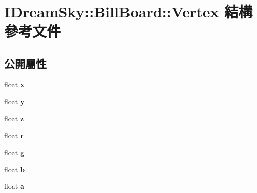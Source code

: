 \hypertarget{struct_i_dream_sky_1_1_bill_board_1_1_vertex}{}\section{I\+Dream\+Sky\+:\+:Bill\+Board\+:\+:Vertex 結構 參考文件}
\label{struct_i_dream_sky_1_1_bill_board_1_1_vertex}
\subsection*{公開屬性}
\begin{DoxyCompactItemize}
\item 
float {\bfseries x}\hypertarget{struct_i_dream_sky_1_1_bill_board_1_1_vertex_a42cf3e2e803a0408517d64661e968404}{}\label{struct_i_dream_sky_1_1_bill_board_1_1_vertex_a42cf3e2e803a0408517d64661e968404}

\item 
float {\bfseries y}\hypertarget{struct_i_dream_sky_1_1_bill_board_1_1_vertex_a92d36b2c938e440eac75be796e89fcd2}{}\label{struct_i_dream_sky_1_1_bill_board_1_1_vertex_a92d36b2c938e440eac75be796e89fcd2}

\item 
float {\bfseries z}\hypertarget{struct_i_dream_sky_1_1_bill_board_1_1_vertex_a68b1b049cd38650c8b683f0033e2f2ca}{}\label{struct_i_dream_sky_1_1_bill_board_1_1_vertex_a68b1b049cd38650c8b683f0033e2f2ca}

\item 
float {\bfseries r}\hypertarget{struct_i_dream_sky_1_1_bill_board_1_1_vertex_aa5c46eedc0b29b1b47008cb9a01fd82e}{}\label{struct_i_dream_sky_1_1_bill_board_1_1_vertex_aa5c46eedc0b29b1b47008cb9a01fd82e}

\item 
float {\bfseries g}\hypertarget{struct_i_dream_sky_1_1_bill_board_1_1_vertex_a176c5ce86e83466b7810f9028d91fa15}{}\label{struct_i_dream_sky_1_1_bill_board_1_1_vertex_a176c5ce86e83466b7810f9028d91fa15}

\item 
float {\bfseries b}\hypertarget{struct_i_dream_sky_1_1_bill_board_1_1_vertex_a7deaddfe40aec739197917be4a105963}{}\label{struct_i_dream_sky_1_1_bill_board_1_1_vertex_a7deaddfe40aec739197917be4a105963}

\item 
float {\bfseries a}\hypertarget{struct_i_dream_sky_1_1_bill_board_1_1_vertex_a0d8281ce398773514b60f02f72227ded}{}\label{struct_i_dream_sky_1_1_bill_board_1_1_vertex_a0d8281ce398773514b60f02f72227ded}


\end{DoxyCompactItemize}
